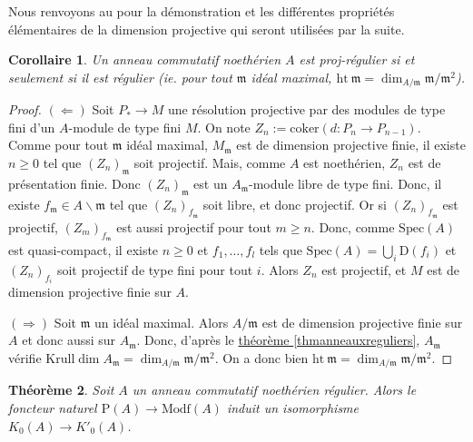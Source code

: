 \documentclass{amsart}
\newcommand{\sref}[2]{\hyperref[#2]{#1 \ref*{#2}}}
\theoremstyle{plain}
\newtheorem{theo}{Théorème}[section]
\newtheorem{coro}[theo]{Corollaire}
\theoremstyle{definition}
\theoremstyle{remark}
\newcommand{\Proj}[1]{\mathrm{P}({#1})}
\newcommand{\Modf}[1]{\mathrm{Modf}({#1})}
\newcommand{\ra}{\rightarrow}
\newcommand{\coker}[1]{\mathrm{coker}({#1})}
\newcommand{\Spec}[1]{\mathrm{Spec}({#1})}
\newcommand{\Open}[1]{\mathrm{D}({#1})}
\begin{document}
Nous renvoyons au \cite[Chp.4]{Weib2} pour la démonstration et les différentes propriétés élémentaires de la dimension projective qui seront utilisées par la suite.

\begin{coro}\label{regulierprojregulier}
  Un anneau commutatif noethérien $A$ est proj-régulier si et seulement si il est régulier (ie. pour tout $\mathfrak{m}$ idéal maximal,
  $\mathrm{ht}\:\mathfrak{m} = \dim_{A/\mathfrak{m}} \mathfrak{m}/\mathfrak{m}^2$).
\end{coro}

\begin{proof}
  $\mathbf{(\Leftarrow)}$ Soit $P_*\ra M$ une résolution projective par des modules de type fini d'un $A$-module de type fini $M$. On note $Z_n:=\coker{d:P_n\ra P_{n-1}}$.
  Comme pour tout $\mathfrak{m}$ idéal maximal, $M_\mathfrak{m}$ est de dimension projective finie, il existe $n\geq 0$ tel que $(Z_n)_\mathfrak{m}$ soit projectif.
  Mais, comme $A$ est noethérien, $Z_n$ est de présentation finie. Donc $(Z_n)_\mathfrak{m}$ est un $A_\mathfrak{m}$-module libre de type fini.
  Donc, il existe $f_\mathfrak{m}\in A\backslash\mathfrak{m}$ tel que $(Z_n)_{f_\mathfrak{m}}$ soit libre, et donc projectif. Or si $(Z_n)_{f_\mathfrak{m}}$
  est projectif, $(Z_m)_{f_\mathfrak{m}}$ est aussi projectif pour tout $m\geq n$. Donc, comme $\Spec{A}$ est quasi-compact, il existe $n\geq 0$ et $f_1,\dotsc,f_l$
  tels que $\Spec{A}=\bigcup_i\Open{f_i}$ et $(Z_n)_{f_i}$ soit projectif de type fini pour tout $i$. Alors $Z_n$ est projectif,
  et $M$ est de dimension projective finie sur $A$.

  $\mathbf{(\Rightarrow)}$ Soit $\mathfrak{m}$ un idéal maximal. Alors $A/\mathfrak{m}$ est de dimension projective finie sur $A$ et donc aussi sur $A_\mathfrak{m}$.
  Donc, d'après le \sref{théorème}{thmanneauxreguliers}, $A_\mathfrak{m}$ vérifie $\mathrm{Krull}\dim A_\mathfrak{m} = \dim_{A/\mathfrak{m}} \mathfrak{m}/\mathfrak{m}^2$.
  On a donc bien $\mathrm{ht}\:\mathfrak{m} = \dim_{A/\mathfrak{m}} \mathfrak{m}/\mathfrak{m}^2$.
\end{proof}


\begin{theo}\label{KegalKprimeAnneauxReguliers}
  Soit $A$ un anneau commutatif noethérien régulier. Alors le foncteur naturel $\Proj{A}\ra\Modf{A}$ induit un isomorphisme $K_0(A)\ra K'_0(A)$.
\end{theo}
\end{document}
